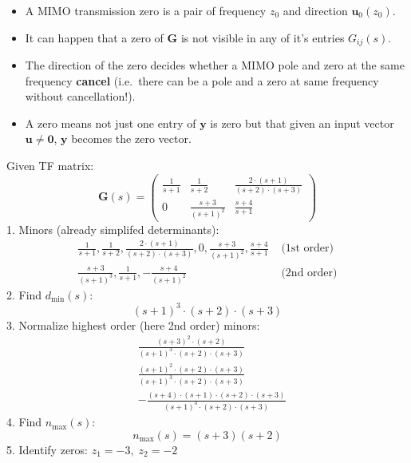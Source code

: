 
\begin{itemize}
    \item A MIMO transmission zero is a pair of frequency $z_0$ and direction $\mathbf{u}_0(z_0)$.
    \item It can happen that a zero of $\mathbf{G}$ is not visible in any of it's entries $G_{ij}(s)$.
    \item The direction of the zero decides whether a MIMO pole and zero at the same frequency \textbf{cancel} (i.e.\ there can be a pole and a zero at same frequency without cancellation!).
    \item A zero means not just one entry of $\mathbf{y}$ is zero but that given an input vector $\mathbf{u} \ne \mathbf{0}$, $\mathbf{y}$ becomes the zero vector.
\end{itemize}

\begin{examplesection}
    Given TF matrix:
    \begin{equation*}
        \mathbf{G}(s)=\begin{pmatrix}
            \frac1{s+1} & \frac1{s+2}           & \frac{2\cdot(s+1)}{(s+2)\cdot(s+3)} \\
            0           & \frac{s+3}{{(s+1)}^2} & \frac{s+4}{s+1}
        \end{pmatrix}
    \end{equation*}
    1. Minors (already simplifed determinants):
    \begin{align*}
        \frac{1}{s+1},\frac{1}{s+2},\frac{2\cdot(s+1)}{(s+2)\cdot(s+3)},0,\frac{s+3}{{(s+1)}^{2}},\frac{s+4}{s+1} & \text{ (1st order)} \\
        \frac{s+3}{{(s+1)}^3},\frac{1}{s+1},-\frac{s+4}{{(s+1)}^2}                                                & \text{ (2nd order)}
    \end{align*}
    2. Find $d_{\min}(s)$:
    \begin{equation*}
        {(s+1)}^3\cdot(s+2)\cdot(s+3)
    \end{equation*}
    3. Normalize highest order (here 2nd order) minors:
    \begin{align*}
         & \frac{{(s+3)}^2\cdot(s+2)}{{(s+1)}^3\cdot(s+2)\cdot(s+3)}                  \\
         & \frac{{(s+1)}^2\cdot(s+2)\cdot(s+3)}{{(s+1)}^3\cdot(s+2)\cdot(s+3)}        \\
         & -\frac{(s+4)\cdot(s+1)\cdot(s+2)\cdot(s+3)}{{(s+1)}^3\cdot(s+2)\cdot(s+3)}
    \end{align*}
    4. Find $n_{\max}(s)$:
    \begin{equation*}
        n_{\max}(s)=(s+3)(s+2)
    \end{equation*}
    5. Identify zeros: $z_1=-3,\;z_2=-2$
\end{examplesection}

